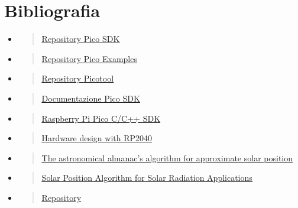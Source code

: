 \chapter{Bibliografia}

\begin{itemize}
\item
  \begin{quote}
  \href{https://github.com/raspberrypi/pico-sdk}{\underline{Repository
  Pico SDK}}
  \end{quote}
\item
  \begin{quote}
  \href{https://github.com/raspberrypi/pico-examples}{\underline{Repository
  Pico Examples}}
  \end{quote}
\item
  \begin{quote}
  \href{https://github.com/raspberrypi/picotool}{\underline{Repository}
  \underline{Picotool}}
  \end{quote}
\item
  \begin{quote}
  \href{https://raspberrypi.github.io/pico-sdk-doxygen/}{\underline{Documentazione
  Pico SDK}}
  \end{quote}
\item
  \begin{quote}
  \href{https://datasheets.raspberrypi.com/pico/raspberry-pi-pico-c-sdk.pdf}{\underline{Raspberry
  Pi Pico C/C++ SDK}}
  \end{quote}
\item
  \begin{quote}
  \href{https://datasheets.raspberrypi.com/rp2040/hardware-design-with-rp2040.pdf}{\underline{Hardware
  design with RP2040}}
  \end{quote}
\item
  \begin{quote}
  \href{https://www.researchgate.net/publication/222131147_The_Astronomical_Almanac's_algorithm_for_approximate_solar_position_1950-2050}{\underline{The
  astronomical almanac's algorithm for approximate solar position}}
  \end{quote}
\item
  \begin{quote}
  \href{https://www.nrel.gov/docs/fy08osti/34302.pdf}{\underline{Solar
  Position Algorithm for Solar Radiation Applications}}
  \end{quote}
\item
  \begin{quote}
  \href{https://github.com/jrowberg/i2cdevlib/blob/master/STM32/HMC5883/HMC5883L.h}{\underline{Repository
}}
\end{quote}
\end{itemize}
